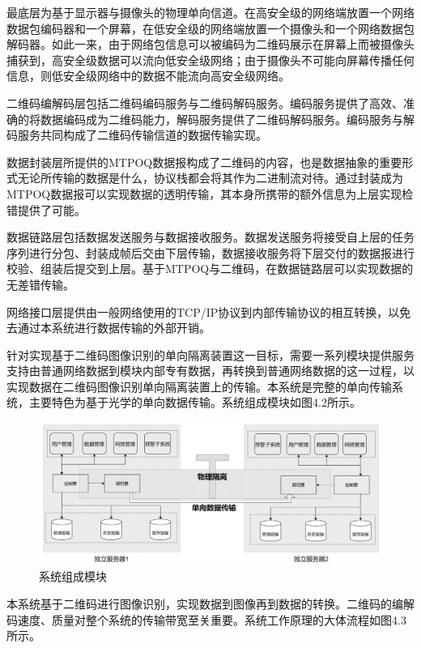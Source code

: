 最底层为基于显示器与摄像头的物理单向信道。在高安全级的网络端放置一个网络数据包编码器和一个屏幕，在低安全级的网络端放置一个摄像头和一个网络数据包解码器。如此一来，由于网络包信息可以被编码为二维码展示在屏幕上而被摄像头捕获到，高安全级数据可以流向低安全级网络；由于摄像头不可能向屏幕传播任何信息，则低安全级网络中的数据不能流向高安全级网络。

二维码编解码层包括二维码编码服务与二维码解码服务。编码服务提供了高效、准确的将数据编码成为二维码能力，解码服务提供了二维码解码服务。编码服务与解码服务共同构成了二维码传输信道的数据传输实现。

数据封装层所提供的MTPOQ数据报构成了二维码的内容，也是数据抽象的重要形式无论所传输的数据是什么，协议栈都会将其作为二进制流对待。通过封装成为MTPOQ数据报可以实现数据的透明传输，其本身所携带的额外信息为上层实现检错提供了可能。

数据链路层包括数据发送服务与数据接收服务。数据发送服务将接受自上层的任务序列进行分包、封装成帧后交由下层传输，数据接收服务将下层交付的数据报进行校验、组装后提交到上层。基于MTPOQ与二维码，在数据链路层可以实现数据的无差错传输。

网络接口层提供由一般网络使用的TCP/IP协议到内部传输协议的相互转换，以免去通过本系统进行数据传输的外部开销。

针对实现基于二维码图像识别的单向隔离装置这一目标，需要一系列模块提供服务支持由普通网络数据到模块内部专有数据，再转换到普通网络数据的这一过程，以实现数据在二维码图像识别单向隔离装置上的传输。本系统是完整的单向传输系统，主要特色为基于光学的单向数据传输。系统组成模块如图4.2所示。

\begin{figure}[!htbp]
\centering
\includegraphics[scale=1]{figures/SModule.png}
\caption{系统组成模块}
\end{figure}

本系统基于二维码进行图像识别，实现数据到图像再到数据的转换。二维码的编解码速度、质量对整个系统的传输带宽至关重要。系统工作原理的大体流程如图4.3所示。


